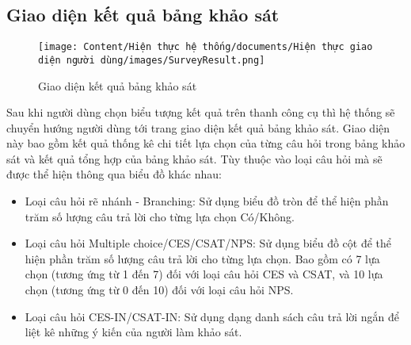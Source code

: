 \subsection{Giao diện kết quả bảng khảo sát}

\begin{figure}[H]
    \centering
    \texttt{[image: Content/Hiện thực hệ thống/documents/Hiện thực giao diện người dùng/images/SurveyResult.png]}
    \vspace{0.5cm}
    \caption{Giao diện kết quả bảng khảo sát}
    \label{fig: Giao diện kết quả bảng khảo sát}
\end{figure}

Sau khi người dùng chọn biểu tượng kết quả trên thanh công cụ thì hệ thống sẽ chuyển hướng người dùng tới trang giao diện kết quả bảng khảo sát. Giao diện này bao gồm kết quả thống kê chi tiết lựa chọn của từng câu hỏi trong bảng khảo sát và kết quả tổng hợp của bảng khảo sát. Tùy thuộc vào loại câu hỏi mà sẽ được thể hiện thông qua biểu đồ khác nhau:
\begin{itemize}
    \item Loại câu hỏi rẽ nhánh - Branching: Sử dụng biểu đồ tròn để thể hiện phần trăm số lượng câu trả lời cho từng lựa chọn Có/Không.
    \item Loại câu hỏi Multiple choice/CES/CSAT/NPS: Sử dụng biểu đồ cột để thể hiện phần trăm số lượng câu trả lời cho từng lựa chọn. Bao gồm có 7 lựa chọn (tương ứng từ 1 đến 7) đối với loại câu hỏi CES và CSAT, và 10 lựa chọn (tương ứng từ 0 đến 10) đối với loại câu hỏi NPS.
    \item Loại câu hỏi CES-IN/CSAT-IN: Sử dụng dạng danh sách câu trả lời ngắn để liệt kê những ý kiến của người làm khảo sát.
\end{itemize}
